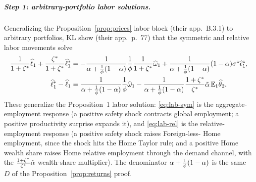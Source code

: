 \subparagraph{Step 1: arbitrary-portfolio labor solutions.} Generalizing the
Proposition~\ref{prop:prices} labor block (their app.~B.3.1) to arbitrary
portfolios, KL show (their app.~p.~77) that the symmetric and relative labor
movements solve
\begin{align}
\frac{1}{1+\zeta^{*}}\widehat{\ell}_1 + \frac{\zeta^{*}}{1+\zeta^{*}}\widehat{\ell}^{*}_1
&= -\frac{1}{\alpha+\frac{1}{\phi}(1-\alpha)}\frac{1}{\phi}\frac{1}{1+\zeta^{*}}\widehat{\omega}_1
+\frac{1}{\alpha+\frac{1}{\phi}(1-\alpha)}(1-\alpha)\sigma^z\widehat{\epsilon}^z_1, \label{eq:lab-sym}\\
\widehat{\ell}^{*}_1 - \widehat{\ell}_1
&= \frac{1}{\alpha+\frac{1}{\phi}(1-\alpha)}\frac{1}{\phi}\widehat{\omega}_1
-\frac{1}{\alpha+\frac{1}{\phi}(1-\alpha)}\frac{1+\zeta^{*}}{\zeta^{*}}\tilde{\alpha}\,\mathbb{E}_1\widehat{\theta}_2. \label{eq:lab-rel}
\end{align}
These generalize the Proposition~1 labor solution: \eqref{eq:lab-sym} is the
aggregate-employment response (a positive safety shock contracts global
employment; a positive productivity surprise expands it), and \eqref{eq:lab-rel}
is the relative-employment response (a positive safety shock raises Foreign-less-
Home employment, since the shock hits the Home Taylor rule; and a positive Home
wealth share raises Home relative employment through the demand channel, with the
$\frac{1+\zeta^{*}}{\zeta^{*}}\tilde{\alpha}$ wealth-share multiplier). The denominator
$\alpha+\frac{1}{\phi}(1-\alpha)$ is the same $D$ of the
Proposition~\ref{prop:returns} proof.

